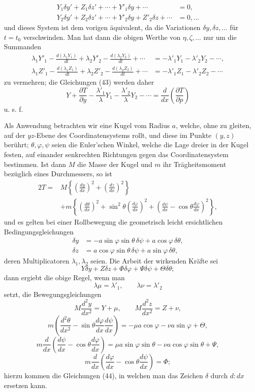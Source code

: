 \documentclass[11pt,a4paper,leqno]{article}
\begin{document}
\[
\begin{aligned}
Y_1\delta y'+Z_1\delta z'+\cdots+Y'_1\delta y+\cdots&=0,\\
Y_2\delta y'+Z_2\delta z'+\cdots+Y'_2\delta y+Z'_2\delta z+\cdots&=0,\ldots
\end{aligned}
\]
und dieses System ist dem vorigen äquivalent, da die Variationen $\delta y,\delta z,\ldots$ für $t=t_0$ verschwinden. Man hat dann die obigen Werthe von $\eta,\zeta,\ldots$ nur um die Summanden
\[
\begin{aligned}
\lambda_1Y'_1-\frac{d(\lambda_1Y_1)}{dt}
+\lambda_2Y'_2-\frac{d(\lambda_2Y_2)}{dt}+\cdots
&=-\lambda'_1Y_1-\lambda'_2Y_2-\cdots,\\
\lambda_1Z'_1-\frac{d(\lambda_1Z_1)}{dt}
+\lambda_2Z'_2-\frac{d(\lambda_2Z_2)}{dt}+\cdots
&=-\lambda'_1Z_1-\lambda'_2Z_2-\cdots
\end{aligned}
\]
zu vermehren; die Gleichungen (43) werden daher
\[
Y+\frac{\partial T}{\partial y}
-\frac{\lambda'_1}{\lambda}Y_1
-\frac{\lambda'_2}{\lambda}Y_2-\cdots
=\frac{d}{dx}\left(\frac{\partial T}{\partial p}\right)
\]
u. s. f.

Als Anwendung betrachten wir eine Kugel vom Radius $a$, welche, ohne zu gleiten, auf der $yz$-Ebene des Coordinatensystems rollt, und diese im Punkte $(y,z)$ berührt; $\theta,\varphi,\psi$ seien die Euler'schen Winkel, welche die Lage dreier in der Kugel festen, auf einander senkrechten Richtungen gegen das Coordinatensystem bestimmen. Ist dann $M$ die Masse der Kugel und $m$ ihr Trägheitsmoment bezüglich eines Durchmessers, so ist
\[
\begin{aligned}
2T={}&M\left\{\left(\frac{dy}{dx}\right)^2+\left(\frac{dz}{dx}\right)^2\right\}\\
&+m\left\{\left(\frac{d\theta}{dx}\right)^2
+\sin^2\theta\left(\frac{d\varphi}{dx}\right)^2
+\left(\frac{d\psi}{dx}-\cos\theta\frac{d\varphi}{dx}\right)^2\right\},
\end{aligned}
\]
und es gelten bei einer Rollbewegung die geometrisch leicht ersichtlichen Bedingungsgleichungen
\begin{equation}\tag{44}
\begin{aligned}
\delta y&=-a\sin\varphi\sin\theta\,\delta\psi+a\cos\varphi\,\delta\theta,\\
\delta z&= a\cos\varphi\sin\theta\,\delta\psi+a\sin\varphi\,\delta\theta,
\end{aligned}
\end{equation}
deren Multiplicatoren $\lambda_1,\lambda_2$ seien. Die Arbeit der wirkenden Kräfte sei
\[
Y\delta y+Z\delta z+\Phi\delta\varphi+\Psi\delta\psi+\Theta\delta\theta;
\]
dann ergiebt die obige Regel, wenn man
\[
\lambda\mu=\lambda'_1,\qquad \lambda\nu=\lambda'_2
\]
setzt, die Bewegungsgleichungen
\[
M\frac{d^2y}{dx^2}=Y+\mu,\qquad
M\frac{d^2z}{dx^2}=Z+\nu,
\]
\[
m\left(\frac{d^2\theta}{dx^2}-\sin\theta\frac{d\varphi}{dx}\frac{d\psi}{dx}\right)
=-\mu a\cos\varphi-\nu a\sin\varphi+\Theta,
\]
\[
m\frac{d}{dx}\left(\frac{d\psi}{dx}-\cos\theta\frac{d\varphi}{dx}\right)
=\mu a\sin\varphi\sin\theta-\nu a\cos\varphi\sin\theta+\Psi,
\]
\[
m\frac{d}{dx}\left(\frac{d\varphi}{dx}-\cos\theta\frac{d\psi}{dx}\right)=\Phi;
\]
hierzu kommen die Gleichungen (44), in welchen man das Zeichen $\delta$ durch $d:dx$ ersetzen kann.
\end{document}
